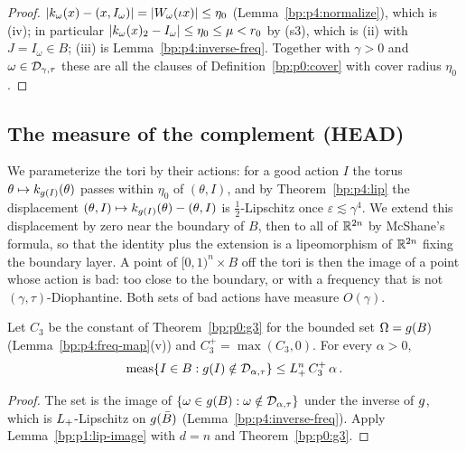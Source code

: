 \begin{proof}
\label{step:p4:rt-cover}
$\lvert k_\omega(x)-(x,I_\omega)\rvert=\lvert W_\omega(\iota x)\rvert\le\eta_0$ (Lemma~\ref{bp:p4:normalize}),
which is (iv); in particular $\lvert k_\omega(x)_2-I_\omega\rvert\le\eta_0\le\mu<r_0$ by (s3), which is (ii)
with $J=I_\omega\in B$; (iii) is Lemma~\ref{bp:p4:inverse-freq}. Together with $\gamma>0$ and
$\omega\in\mathcal{D}_{\gamma,\tau}$ these are all the clauses of Definition~\ref{bp:p0:cover} with
cover radius $\eta_0$.
\end{proof}

\subsection{The measure of the complement (HEAD)}\label{bp:p4:sec-measure}

We parameterize the tori by their actions: for a good action $I$ the torus
$\theta\mapsto k_{g(I)}(\theta)$ passes within $\eta_0$ of $(\theta,I)$, and by
Theorem~\ref{bp:p4:lip} the displacement $(\theta,I)\mapsto k_{g(I)}(\theta)-(\theta,I)$ is
$\frac12$-Lipschitz once $\varepsilon\lesssim\gamma^4$. We extend this displacement by zero near
the boundary of $B$, then to all of $\mathbb{R}^{2n}$ by McShane's formula, so that the identity plus the
extension is a lipeomorphism of $\mathbb{R}^{2n}$ fixing the boundary layer. A point of
$[0,1)^n\times B$ off the tori is then the image of a point whose action is bad: too close to the
boundary, or with a frequency that is not $(\gamma,\tau)$-Diophantine. Both sets of bad actions have
measure $O(\gamma)$.

\begin{lemma}\label{bp:p4:preimage-measure}
Let $C_3$ be the constant of Theorem~\ref{bp:p0:g3} for the bounded set $\Omega=g(B)$
(Lemma~\ref{bp:p4:freq-map}(v)) and $C_3^+=\max(C_3,0)$. For every $\alpha>0$,
\begin{equation*}
\operatorname{meas}\{I\in B:g(I)\notin\mathcal{D}_{\alpha,\tau}\}\le L_{+}^n\,C_3^+\,\alpha\,.
\end{equation*}
\end{lemma}

\begin{proof}
\label{step:p4:pm-proof}
The set is the image of $\{\omega\in g(B):\omega\notin\mathcal{D}_{\alpha,\tau}\}$ under the inverse of
$g$, which is $L_{+}$-Lipschitz on $g(\bar B)$ (Lemma~\ref{bp:p4:inverse-freq}). Apply
Lemma~\ref{bp:p1:lip-image} with $d=n$ and Theorem~\ref{bp:p0:g3}.
\end{proof}

